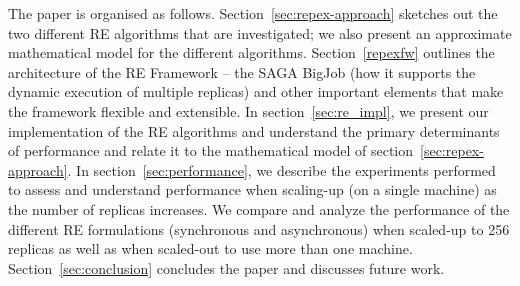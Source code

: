 \documentclass{rspublic}
\newcommand{\jhanote}[1]{ {\textcolor{red} { ***shantenu: #1 }}}
\newcommand{\alnote}[1]{ {\textcolor{blue} { ***andre: #1 }}}
\newcommand{\athotanote}[1]{ {\textcolor{green} { ***athota: #1 }}}
\newcommand{\alnote}[1]{}
\newcommand{\athotanote}[1]{}
\newcommand{\jhanote}[1]{}
\begin{document}




The paper is organised as follows. Section~\ref{sec:repex-approach}
sketches out the two different RE algorithms that are investigated;
we also present an approximate mathematical model for the different
algorithms.  Section~\ref{repexfw} outlines the architecture of the RE
Framework -- the SAGA BigJob (how it supports the dynamic execution of
multiple replicas) and other important elements that make the
framework flexible and extensible.  In section~\ref{sec:re_impl}, we
present our implementation of the RE algorithms and understand the
primary determinants of performance and relate it to the mathematical
model of section~\ref{sec:repex-approach}.  In section~\ref{sec:performance}, we
describe the experiments performed to assess and understand
performance when scaling-up (on a single machine) as the number of
replicas increases.  We compare and analyze the performance of the
different RE formulations (synchronous and asynchronous) when
scaled-up to 256 replicas as well as when scaled-out to use more than
one machine. Section~\ref{sec:conclusion} concludes the paper and
discusses future work.
\end{document}
